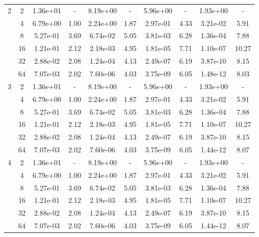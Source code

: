 \begin{table}[htbp]
\begin{center}
\begin{tabular}{| c | c | c c | c c | c c | c c |}
			2	& 2 & 1.36e+01 & - & 8.19e+00 & - & 5.96e+00 & - & 1.93e+00 & - \\
				& 4 & 6.79e+00 & 1.00 & 2.24e+00 & 1.87 & 2.97e-01 & 4.33 & 3.21e-02 & 5.91 \\
				& 8 & 5.27e-01 & 3.69 & 6.74e-02 & 5.05 & 3.81e-03 & 6.28 & 1.36e-04 & 7.88 \\
				& 16 & 1.21e-01 & 2.12 & 2.18e-03 & 4.95 & 1.81e-05 & 7.71 & 1.10e-07 & 10.27 \\
				& 32 & 2.88e-02 & 2.08 & 1.24e-04 & 4.13 & 2.49e-07 & 6.19 & 3.87e-10 & 8.15 \\
				& 64 & 7.07e-03 & 2.02 & 7.60e-06 & 4.03 & 3.75e-09 & 6.05 & 1.48e-12 & 8.03 \\

			\hline

			3	& 2 & 1.36e+01 & - & 8.19e+00 & - & 5.96e+00 & - & 1.93e+00 & - \\
				& 4 & 6.79e+00 & 1.00 & 2.24e+00 & 1.87 & 2.97e-01 & 4.33 & 3.21e-02 & 5.91 \\
				& 8 & 5.27e-01 & 3.69 & 6.74e-02 & 5.05 & 3.81e-03 & 6.28 & 1.36e-04 & 7.88 \\
				& 16 & 1.21e-01 & 2.12 & 2.18e-03 & 4.95 & 1.81e-05 & 7.71 & 1.10e-07 & 10.27 \\
				& 32 & 2.88e-02 & 2.08 & 1.24e-04 & 4.13 & 2.49e-07 & 6.19 & 3.87e-10 & 8.15 \\
				& 64 & 7.07e-03 & 2.02 & 7.60e-06 & 4.03 & 3.75e-09 & 6.05 & 1.44e-12 & 8.07 \\

			\hline

			4	& 2 & 1.36e+01 & - & 8.19e+00 & - & 5.96e+00 & - & 1.93e+00 & - \\
				& 4 & 6.79e+00 & 1.00 & 2.24e+00 & 1.87 & 2.97e-01 & 4.33 & 3.21e-02 & 5.91 \\
				& 8 & 5.27e-01 & 3.69 & 6.74e-02 & 5.05 & 3.81e-03 & 6.28 & 1.36e-04 & 7.88 \\
				& 16 & 1.21e-01 & 2.12 & 2.18e-03 & 4.95 & 1.81e-05 & 7.71 & 1.10e-07 & 10.27 \\
				& 32 & 2.88e-02 & 2.08 & 1.24e-04 & 4.13 & 2.49e-07 & 6.19 & 3.87e-10 & 8.15 \\
				& 64 & 7.07e-03 & 2.02 & 7.60e-06 & 4.03 & 3.75e-09 & 6.05 & 1.44e-12 & 8.07 \\

			\hline
		\end{tabular}
	\end{center}
\end{table}


